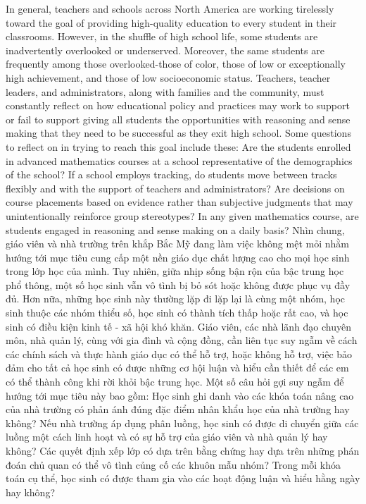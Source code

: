 \documentclass[
  10pt,
  a4paper,
  landscape,
  twoside,
  openany
]{scrbook}
\newcommand{\EN}[1]{#1}
\newcommand{\VI}[1]{#1}
\newcommand{\NOTE}[1]{#1}
\begin{document}
\TriPara
{
\EN{In general, teachers and schools across North America are working tirelessly toward the goal of providing high-quality education to every student in their classrooms. However, in the shuffle of high school life, some students are inadvertently overlooked or underserved. Moreover, the same students are frequently among those overlooked-those of color, those of low or exceptionally high achievement, and those of low socioeconomic status. Teachers, teacher leaders, and administrators, along with families and the community, must constantly reflect on how educational policy and practices may work to support or fail to support giving all students the opportunities with reasoning and sense making that they need to be successful as they exit high school. Some questions to reflect on in trying to reach this goal include these: Are the students enrolled in advanced mathematics courses at a school representative of the demographics of the school? If a school employs tracking, do students move between tracks flexibly and with the support of teachers and administrators? Are decisions on course placements based on evidence rather than subjective judgments that may unintentionally reinforce group stereotypes? In any given mathematics course, are students engaged in reasoning and sense making on a daily basis?}
}
{
\VI{Nhìn chung, giáo viên và nhà trường trên khắp Bắc Mỹ đang làm việc không mệt mỏi nhằm hướng tới mục tiêu cung cấp một nền giáo dục chất lượng cao cho mọi học sinh trong lớp học của mình. Tuy nhiên, giữa nhịp sống bận rộn của bậc trung học phổ thông, một số học sinh vẫn vô tình bị bỏ sót hoặc không được phục vụ đầy đủ. Hơn nữa, những học sinh này thường lặp đi lặp lại là cùng một nhóm, học sinh thuộc các nhóm thiểu số, học sinh có thành tích thấp hoặc rất cao, và học sinh có điều kiện kinh tế - xã hội khó khăn. Giáo viên, các nhà lãnh đạo chuyên môn, nhà quản lý, cùng với gia đình và cộng đồng, cần liên tục suy ngẫm về cách các chính sách và thực hành giáo dục có thể hỗ trợ, hoặc không hỗ trợ, việc bảo đảm cho tất cả học sinh có được những cơ hội luận và hiểu cần thiết để các em có thể thành công khi rời khỏi bậc trung học. Một số câu hỏi gợi suy ngẫm để hướng tới mục tiêu này bao gồm: Học sinh ghi danh vào các khóa toán nâng cao của nhà trường có phản ánh đúng đặc điểm nhân khẩu học của nhà trường hay không? Nếu nhà trường áp dụng phân luồng, học sinh có được di chuyển giữa các luồng một cách linh hoạt và có sự hỗ trợ của giáo viên và nhà quản lý hay không? Các quyết định xếp lớp có dựa trên bằng chứng hay dựa trên những phán đoán chủ quan có thể vô tình củng cố các khuôn mẫu nhóm? Trong mỗi khóa toán cụ thể, học sinh có được tham gia vào các hoạt động luận và hiểu hằng ngày hay không?}
}
{
\NOTE{}
}
\end{document}
